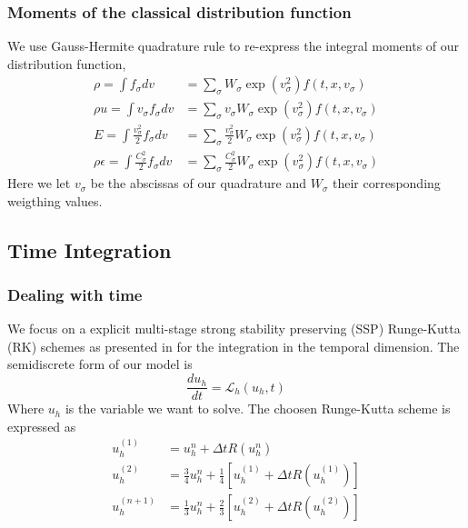 \begin{frame}
	\frametitle{Moments of the classical distribution function}
	We use Gauss-Hermite quadrature rule to re-express the integral moments of our distribution function,
	\begin{subequations}
	\begin{align}
	\rho = \int f_\sigma dv &= \sum_\sigma W_\sigma \exp{(v_\sigma^2)} f(t,x,v_\sigma)\\
	\rho u = \int v_\sigma f_\sigma dv &= \sum_\sigma v_\sigma W_\sigma \exp{(v_\sigma^2)} f(t,x,v_\sigma)\\
	E = \int \frac{v_\sigma^2}{2} f_\sigma dv &= \sum_\sigma \frac{v_\sigma^2}{2} W_\sigma \exp{(v_\sigma^2)} f(t,x,v_\sigma)\\
	\rho \epsilon = \int \frac{C_\sigma^2}{2} f_\sigma dv &= \sum_\sigma \frac{C_\sigma^2}{2} W_\sigma \exp{(v_\sigma^2)} f(t,x,v_\sigma)
	\end{align}
	\end{subequations}
	Here we let $v_\sigma$ be the abscissas of our quadrature and $W_\sigma$ their corresponding weigthing values. 
\end{frame} 

\subsection{Time Integration}
\begin{frame} \frametitle{Dealing with time}
	We focus on a explicit multi-stage strong stability preserving (SSP) Runge-Kutta (RK) schemes as presented in \cite{Gottlieb2005} for the integration in the temporal dimension. The semidiscrete form of our model is 
	\begin{equation}
		\frac{du_h}{dt} = \mathcal{L}_h(u_h,t)
	\label{eq:semidiscrete_problem}
	\end{equation}
	Where $u_h$ is the variable we want to solve. The choosen Runge-Kutta scheme is expressed as 
	\begin{equation}
		\begin{split}
		u_h^{(1)}   &= u_h^{n} + \Delta t R(u_h^{n}) \\
		u_h^{(2)}   &= \frac{3}{4} u_h^{n} + \frac{1}{4}[u_h^{(1)}+\Delta t R(u_h^{(1)})] \\
		u_h^{(n+1)} &= \frac{1}{3} u_h^{n} + \frac{2}{3}[u_h^{(2)}+\Delta t R(u_h^{(2)})]
	\end{split}
	\end{equation}
\end{frame}

